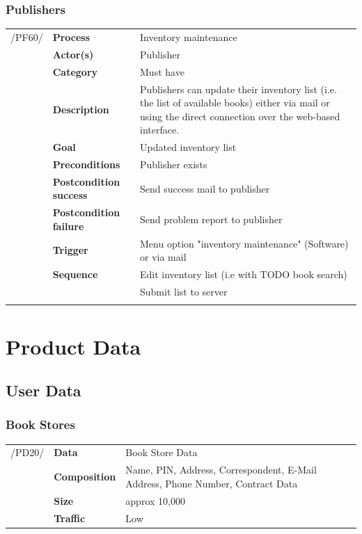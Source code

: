 \documentclass[11pt,a4paper,oneside,svgnames]{report}
\begin{document}
\subsection{Publishers}

\noindent
\begin{tabular}{p{1.5cm}p{3cm}p{8cm}}
\cellcolor{white}/PF60/	& \textbf{Process} & Inventory maintenance\\
\cellcolor{white}		& \textbf{Actor(s)} & Publisher\\
\cellcolor{white}		& \textbf{Category} & Must have\\
\cellcolor{white}		& \textbf{Description}	 & Publishers can update their inventory list
(i.e. the list of available books) either via mail or using the direct connection over the web-based interface.\\
\cellcolor{white}		& \textbf{Goal} & Updated inventory list\\
\cellcolor{white}		& \textbf{Preconditions} & Publisher exists\\
\cellcolor{white}		& \textbf{Postcondition success} & Send success mail to publisher\\
\cellcolor{white}		& \textbf{Postcondition failure} & Send problem report to publisher\\
\cellcolor{white}		& \textbf{Trigger} & Menu option "inventory maintenance" (Software) or via mail\\
\cellcolor{white}		& \textbf{Sequence} & Edit inventory list (i.e with TODO book search)\\
\cellcolor{white}		& & Submit list to server\\
\cellcolor{white}\hfill \\
\end{tabular}


\chapter{Product Data}
\section{User Data}
\subsection{Book Stores}

\begin{tabular}{llp{8.75cm}}
\cellcolor{white}/PD20/	& \textbf{Data}			& Book Store Data\\
\cellcolor{white}		& \textbf{Composition}	& Name, PIN, Address, Correspondent, E-Mail Address, Phone Number, Contract Data\\
\cellcolor{white}		& \textbf{Size}		& approx 10,000\\
\cellcolor{white}		& \textbf{Traffic}		& Low\\
\end{tabular} 
\end{document}
